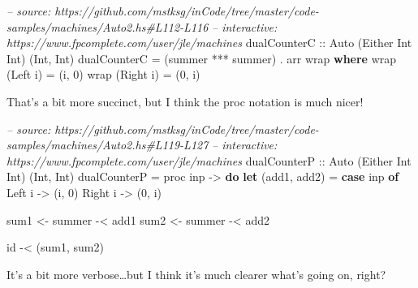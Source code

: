 \documentclass[]{article}
\newenvironment{Shaded}{}{}
\newcommand{\CommentTok}[1]{\textcolor[rgb]{0.38,0.63,0.69}{\textit{#1}}}
\newcommand{\DataTypeTok}[1]{\textcolor[rgb]{0.56,0.13,0.00}{#1}}
\newcommand{\DecValTok}[1]{\textcolor[rgb]{0.25,0.63,0.44}{#1}}
\newcommand{\FunctionTok}[1]{\textcolor[rgb]{0.02,0.16,0.49}{#1}}
\newcommand{\KeywordTok}[1]{\textcolor[rgb]{0.00,0.44,0.13}{\textbf{#1}}}
\newcommand{\NormalTok}[1]{#1}
\newcommand{\OtherTok}[1]{\textcolor[rgb]{0.00,0.44,0.13}{#1}}
\begin{document}
\begin{Shaded}
\begin{Highlighting}[]
\CommentTok{-- source: https://github.com/mstksg/inCode/tree/master/code-samples/machines/Auto2.hs#L112-L116}
\CommentTok{-- interactive: https://www.fpcomplete.com/user/jle/machines}
\OtherTok{dualCounterC ::} \DataTypeTok{Auto}\NormalTok{ (}\DataTypeTok{Either} \DataTypeTok{Int} \DataTypeTok{Int}\NormalTok{) (}\DataTypeTok{Int}\NormalTok{, }\DataTypeTok{Int}\NormalTok{)}
\NormalTok{dualCounterC }\FunctionTok{=}\NormalTok{ (summer }\FunctionTok{***}\NormalTok{ summer) }\FunctionTok{.}\NormalTok{ arr wrap}
  \KeywordTok{where}
\NormalTok{    wrap (}\DataTypeTok{Left}\NormalTok{ i)  }\FunctionTok{=}\NormalTok{ (i, }\DecValTok{0}\NormalTok{)}
\NormalTok{    wrap (}\DataTypeTok{Right}\NormalTok{ i) }\FunctionTok{=}\NormalTok{ (}\DecValTok{0}\NormalTok{, i)}
\end{Highlighting}
\end{Shaded}

That's a bit more succinct, but I think the proc notation is much nicer!

\begin{Shaded}
\begin{Highlighting}[]
\CommentTok{-- source: https://github.com/mstksg/inCode/tree/master/code-samples/machines/Auto2.hs#L119-L127}
\CommentTok{-- interactive: https://www.fpcomplete.com/user/jle/machines}
\OtherTok{dualCounterP ::} \DataTypeTok{Auto}\NormalTok{ (}\DataTypeTok{Either} \DataTypeTok{Int} \DataTypeTok{Int}\NormalTok{) (}\DataTypeTok{Int}\NormalTok{, }\DataTypeTok{Int}\NormalTok{)}
\NormalTok{dualCounterP }\FunctionTok{=}\NormalTok{ proc inp }\OtherTok{->} \KeywordTok{do}
    \KeywordTok{let}\NormalTok{ (add1, add2) }\FunctionTok{=} \KeywordTok{case}\NormalTok{ inp }\KeywordTok{of} \DataTypeTok{Left}\NormalTok{ i  }\OtherTok{->}\NormalTok{ (i, }\DecValTok{0}\NormalTok{)}
                                   \DataTypeTok{Right}\NormalTok{ i }\OtherTok{->}\NormalTok{ (}\DecValTok{0}\NormalTok{, i)}

\NormalTok{    sum1 }\OtherTok{<-}\NormalTok{ summer }\FunctionTok{-<}\NormalTok{ add1}
\NormalTok{    sum2 }\OtherTok{<-}\NormalTok{ summer }\FunctionTok{-<}\NormalTok{ add2}

\NormalTok{    id }\FunctionTok{-<}\NormalTok{ (sum1, sum2)}
\end{Highlighting}
\end{Shaded}

It's a bit more verbose\ldots{}but I think it's much clearer what's going on,
right?
\end{document}
